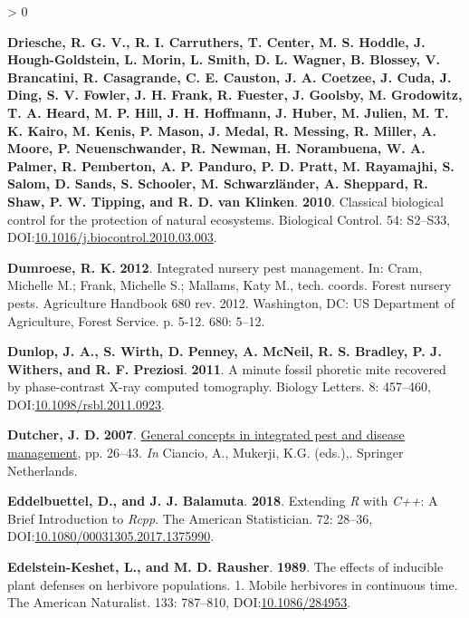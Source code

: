 \documentclass{ufdissertation}[overrideChapters] %
\newlength{\cslhangindent}
\newenvironment{CSLReferences}[2] %
 {%
  \setlength{\parindent}{0pt}
  \ifodd #1 \everypar{\setlength{\hangindent}{\cslhangindent}}\ignorespaces\fi
  \ifnum #2 > 0
  \setlength{\parskip}{#2\baselineskip}
  \fi
 }%
 {}
\begin{document}
{\begin{CSLReferences}{1}{1}
\leavevmode{}%
\textbf{Driesche, R. G. V., R. I. Carruthers, T. Center, M. S. Hoddle, J. Hough-Goldstein, L. Morin, L. Smith, D. L. Wagner, B. Blossey, V. Brancatini, R. Casagrande, C. E. Causton, J. A. Coetzee, J. Cuda, J. Ding, S. V. Fowler, J. H. Frank, R. Fuester, J. Goolsby, M. Grodowitz, T. A. Heard, M. P. Hill, J. H. Hoffmann, J. Huber, M. Julien, M. T. K. Kairo, M. Kenis, P. Mason, J. Medal, R. Messing, R. Miller, A. Moore, P. Neuenschwander, R. Newman, H. Norambuena, W. A. Palmer, R. Pemberton, A. P. Panduro, P. D. Pratt, M. Rayamajhi, S. Salom, D. Sands, S. Schooler, M. Schwarzländer, A. Sheppard, R. Shaw, P. W. Tipping, and R. D. van Klinken}. \textbf{2010}. Classical biological control for the protection of natural ecosystems. Biological Control. 54: S2--S33, DOI:\href{https://doi.org/10.1016/j.biocontrol.2010.03.003}{10.1016/j.biocontrol.2010.03.003}.

\leavevmode{}%
\textbf{Dumroese, R. K.} \textbf{2012}. Integrated nursery pest management. In: Cram, Michelle M.; Frank, Michelle S.; Mallams, Katy M., tech. coords. Forest nursery pests. Agriculture Handbook 680 rev. 2012. Washington, DC: US Department of Agriculture, Forest Service. p. 5-12. 680: 5--12.

\leavevmode{}%
\textbf{Dunlop, J. A., S. Wirth, D. Penney, A. McNeil, R. S. Bradley, P. J. Withers, and R. F. Preziosi}. \textbf{2011}. A minute fossil phoretic mite recovered by phase-contrast {X-ray} computed tomography. Biology Letters. 8: 457--460, DOI:\href{https://doi.org/10.1098/rsbl.2011.0923}{10.1098/rsbl.2011.0923}.

\leavevmode{}%
\textbf{Dutcher, J. D.} \textbf{2007}. \href{https://www.ebook.de/de/product/6740472/general_concepts_in_integrated_pest_and_disease_management.html}{General concepts in integrated pest and disease management}, pp. 26--43. \emph{In} Ciancio, A., Mukerji, K.G. (eds.),. Springer Netherlands.

\leavevmode{}%
\textbf{Eddelbuettel, D., and J. J. Balamuta}. \textbf{2018}. {Extending \emph{R} with \emph{C++}: A Brief Introduction to \emph{Rcpp}}. The American Statistician. 72: 28--36, DOI:\href{https://doi.org/10.1080/00031305.2017.1375990}{10.1080/00031305.2017.1375990}.

\leavevmode{}%
\textbf{Edelstein-Keshet, L., and M. D. Rausher}. \textbf{1989}. The effects of inducible plant defenses on herbivore populations. 1. Mobile herbivores in continuous time. The American Naturalist. 133: 787--810, DOI:\href{https://doi.org/10.1086/284953}{10.1086/284953}.


\end{CSLReferences}}
\end{document}
